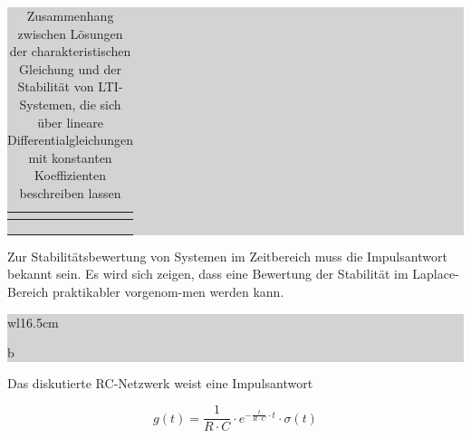 \begin{table}[H]
\caption{Zusammenhang zwischen Lösungen der charakteristischen Gleichung und der Stabilität von LTI-Systemen, die sich über lineare Differentialgleichungen mit konstanten Koeffizienten beschreiben lassen }
\setlength{\fboxsep}{0pt}%
\colorbox{lightgray}{%
%
\begin{tabular}{| c | c |}
\hline
\parbox[c][0.28in][c]{3.3in}{\smallskip\centering\textbf{\selectfont{Eigenschaft}}} & \parbox[c][0.28in][c]{3.3in}{\smallskip\centering\textbf{\selectfont{Bedeutung}}}\\ \hline

\parbox[c][0.4in][c]{3.3in}{} &
\parbox[c][0.4in][c]{3.3in}{}\\ \hline

\parbox[c][0.9in][c]{3.3in}{} & 
\parbox[c][0.9in][c]{3.3in}{}\\ \hline

\parbox[c][0.4in][c]{3.3in}{} &
\parbox[c][0.4in][c]{3.3in}{}\\ \hline

\end{tabular}%
}\bigskip
\label{tab:threeten}
\end{table}

\noindent Zur Stabilitätsbewertung von Systemen im Zeitbereich muss die Impulsantwort bekannt sein. Es wird sich zeigen, dass eine Bewertung der Stabilität im Laplace-Bereich praktikabler vorgenom-men werden kann.\bigskip

\noindent
\colorbox{lightgray}{%
%
\renewcommand\arraystretch{0.6}%
\begin{tabular}{ wl{16.5cm} }
{\selectfont{
Beispiel: RC-Netzwerk als stabiles System}}
\end{tabular}%
 b}\bigskip

\noindent Das diskutierte RC-Netzwerk weist eine Impulsantwort

\begin{equation}\label{eq:threehundredeightyseven}
g\left(t\right)=\frac{1}{R\cdot C} \cdot e^{-\frac{t}{R\cdot C} \cdot t} \cdot \sigma \left(t\right)
\end{equation}

